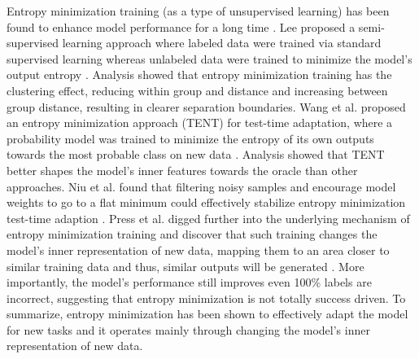 \documentclass{article}
\begin{document}
Entropy minimization training (as a type of unsupervised learning) has been found to enhance model performance for a long time \cite{lee2013pseudo,wangtent,niutowards,press2024entropy}. Lee proposed a semi-supervised learning approach where labeled data were trained via standard supervised learning whereas unlabeled data were trained to minimize the model's output entropy \cite{lee2013pseudo}. Analysis showed that entropy minimization training has the clustering effect, reducing within group and distance and increasing between group distance, resulting in clearer separation boundaries. Wang et al. proposed an entropy minimization approach (TENT) for test-time adaptation, where a probability model was trained to minimize the entropy of its own outputs towards the most probable class on new data \cite{wangtent}. Analysis showed that TENT better shapes the model's inner features towards the oracle than other approaches. Niu et al. found that filtering noisy samples and encourage model weights to go to a flat minimum could effectively stabilize entropy minimization test-time adaption \cite{niutowards}. Press et al. digged further into the underlying mechanism of entropy minimization training and discover that such training changes the model's inner representation of new data, mapping them to an area closer to similar training data and thus, similar outputs will be generated \cite{press2024entropy}. More importantly, the model's performance still improves even 100\% labels are incorrect, suggesting that entropy minimization is not totally success driven. To summarize, entropy minimization has been shown to effectively adapt the model for new tasks and it operates mainly through changing the model's inner representation of new data. 
\end{document}
